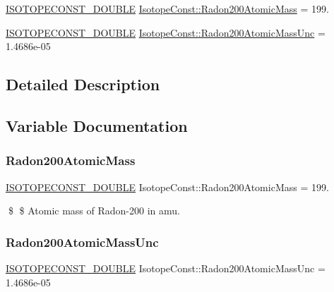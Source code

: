 \begin{DoxyCompactItemize}
\item 
\mbox{\hyperlink{group___isotope_const-_macros_ga8f45a7272ce02c0b4c65c44636ed719a}{I\+S\+O\+T\+O\+P\+E\+C\+O\+N\+S\+T\+\_\+\+D\+O\+U\+B\+LE}} \mbox{\hyperlink{group___isotope_const-_radon-_rn200_gaa733ef1f66a521ffe04ff550f87354a2}{Isotope\+Const\+::\+Radon200\+Atomic\+Mass}} = 199.
\item 
\mbox{\hyperlink{group___isotope_const-_macros_ga8f45a7272ce02c0b4c65c44636ed719a}{I\+S\+O\+T\+O\+P\+E\+C\+O\+N\+S\+T\+\_\+\+D\+O\+U\+B\+LE}} \mbox{\hyperlink{group___isotope_const-_radon-_rn200_gab20f800320cdd6c956af688604999dd9}{Isotope\+Const\+::\+Radon200\+Atomic\+Mass\+Unc}} = 1.\+4686e-\/05
\end{DoxyCompactItemize}


\subsection{Detailed Description}


\subsection{Variable Documentation}
\mbox{\label{group___isotope_const-_radon-_rn200_gaa733ef1f66a521ffe04ff550f87354a2}} 
\subsubsection{\texorpdfstring{Radon200\+Atomic\+Mass}{Radon200AtomicMass}}
{\footnotesize\ttfamily \mbox{\hyperlink{group___isotope_const-_macros_ga8f45a7272ce02c0b4c65c44636ed719a}{I\+S\+O\+T\+O\+P\+E\+C\+O\+N\+S\+T\+\_\+\+D\+O\+U\+B\+LE}} Isotope\+Const\+::\+Radon200\+Atomic\+Mass = 199.}

\$ \$ Atomic mass of Radon-\/200 in amu. \mbox{\label{group___isotope_const-_radon-_rn200_gab20f800320cdd6c956af688604999dd9}} 
\subsubsection{\texorpdfstring{Radon200\+Atomic\+Mass\+Unc}{Radon200AtomicMassUnc}}
{\footnotesize\ttfamily \mbox{\hyperlink{group___isotope_const-_macros_ga8f45a7272ce02c0b4c65c44636ed719a}{I\+S\+O\+T\+O\+P\+E\+C\+O\+N\+S\+T\+\_\+\+D\+O\+U\+B\+LE}} Isotope\+Const\+::\+Radon200\+Atomic\+Mass\+Unc = 1.\+4686e-\/05}

